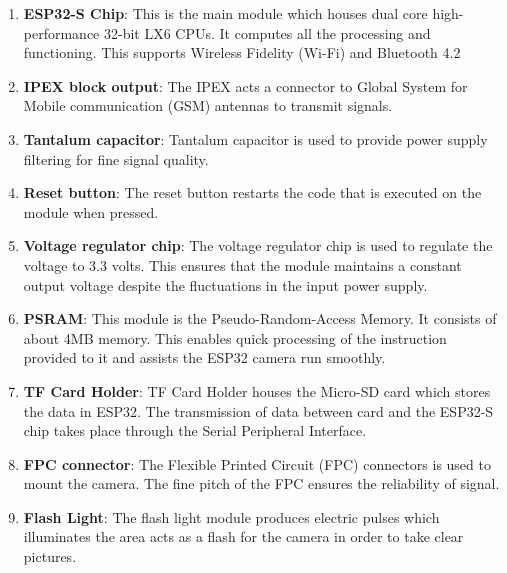 \begin{enumerate}
	\item \textbf{ESP32-S Chip}: This is the main module which houses dual core high-performance 32-bit LX6 CPUs. It computes all the processing and functioning. This supports Wireless Fidelity (Wi-Fi) and Bluetooth 4.2\\
	
	\item \textbf{IPEX block output}: The IPEX acts a connector to Global System for Mobile communication (GSM) antennas to transmit signals.\\
	
	\item \textbf{Tantalum capacitor}: Tantalum capacitor is used to provide power supply filtering for fine signal quality.\\
	
	\item \textbf{Reset button}: The reset button restarts the code that is executed on the module when pressed.\\
	
	\item \textbf{Voltage regulator chip}: The voltage regulator chip is used to regulate the voltage to 3.3 volts. This ensures that the module maintains a constant output voltage despite the fluctuations in the input power supply.\\
	
	\item \textbf{PSRAM}: This module is the Pseudo-Random-Access Memory. It consists of about 4MB memory. This enables quick processing of the instruction provided to it and assists the ESP32 camera run smoothly.\\
	
	\item \textbf{TF Card Holder}: TF Card Holder houses the Micro-SD card which stores the data in ESP32. The transmission of data between card and the ESP32-S chip takes place through the Serial Peripheral Interface.\\
	
	\item \textbf{FPC connector}: The Flexible Printed Circuit (FPC) connectors is used to mount the camera. The fine pitch of the FPC ensures the reliability of signal.\\
	
	\item \textbf{Flash Light}: The flash light module produces electric pulses which illuminates the area acts as a flash for the camera in order to take clear pictures.\\
\end{enumerate}




